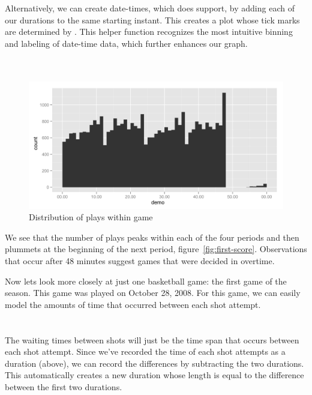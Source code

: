 \documentclass[article]{jss}
\begin{document}
Alternatively, we can create date-times, which  does support, by adding each of our durations to the same starting instant. This creates a plot whose tick marks are determined by . This helper function recognizes the most intuitive binning and labeling of date-time data, which further enhances our graph.\\

\\
\\

\begin{figure}[htpb]
  \centering
  \includegraphics[width=\textwidth]{play-time-histogram2.png}        
  \caption{Distribution of plays within game}
  \label{fig:plays}
\end{figure}


We see that the number of plays peaks within each of the four periods and then plummets at the beginning of the next period, figure~\ref{fig:first-score}. Observations that occur after 48 minutes suggest games that were decided in overtime.

Now lets look more closely at just one basketball game: the first game of the season. This game was played on October 28, 2008. For this game, we can easily model the amounts of time that occurred between each shot attempt.\\

\\
\\

The waiting times between shots will just be the time span that occurs between each shot attempt. Since we've recorded the time of each shot attempts as a duration (above), we can record the differences by subtracting the two durations. This automatically creates a new duration whose length is equal to the difference between the first two durations.\\
\end{document}
